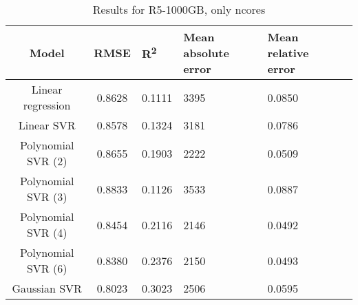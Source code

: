 \begin{table}[H]
\centering
\begin{adjustbox}{center}
\begin{tabular}{c | c M{1.2cm} M{2.5cm} M{2.5cm} M{1.8cm}}
Model & RMSE & R\textsuperscript{2} & Mean absolute error & Mean relative error \tabularnewline
\hline
Linear regression & 0.8628 & 0.1111 &   3395 & 0.0850 \\
Linear SVR & 0.8578 & 0.1324 &   3181 & 0.0786 \\
Polynomial SVR (2) & 0.8655 & 0.1903 &   2222 & 0.0509 \\
Polynomial SVR (3) & 0.8833 & 0.1126 &   3533 & 0.0887 \\
Polynomial SVR (4) & 0.8454 & 0.2116 &   2146 & 0.0492 \\
Polynomial SVR (6) & 0.8380 & 0.2376 &   2150 & 0.0493 \\
Gaussian SVR & 0.8023 & 0.3023 &   2506 & 0.0595 \\
\end{tabular}
\end{adjustbox}
\\
\caption{Results for R5-1000GB, only ncores}
\label{tab:only_1_linear_R5_1000}
\end{table}

